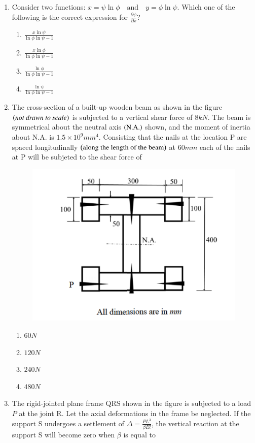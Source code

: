 \documentclass[journal,12pt,onecolumn]{IEEEtran}
\theoremstyle{remark}
\begin{document}
\begin{enumerate}
\item Consider two functions: 
$x = \psi \ln \phi \quad \text{and} \quad y = \phi \ln \psi.$
Which one of the following is the correct expression for $\frac{\partial \psi}{\partial x}$?

\hfill{}
\begin{enumerate}
\item $\displaystyle \frac{x \ln \psi}{\ln \phi \ln \psi - 1}$
\item $\displaystyle \frac{x \ln \phi}{\ln \phi \ln \psi - 1}$
\item $\displaystyle \frac{\ln \phi}{\ln \phi \ln \psi - 1}$
\item $\displaystyle \frac{\ln \psi}{\ln \phi \ln \psi - 1}$
\end{enumerate}

\item The cross-section of a built-up wooden beam as shown in the figure $\left(\textit{not drawn to scale}\right)$ is subjected to a vertical shear force of $8kN$. The beam is symmetrical about the neutral axis $\left(\text{N.A.}\right)$ shown, and the moment of inertia about N.A. is $1.5\times10^9mm^4$. Consisting that the nails at the location P are spaced longitudinally $\left(\text{along the length of the beam}\right)$ at $60mm$ each of the nails at P will be subjeted to the shear force of

\hfill{}
\begin{figure}[H]
\centering
\includegraphics[width=0.5\columnwidth]{figs/q31.png}
\caption*{}
\label{fig:Q.31}
\end{figure}
\begin{enumerate}
\item $60N$
\item $120N$
\item $240N$
\item $480N$
\end{enumerate}

\item The rigid-jointed plane frame QRS shown in the figure is subjected to a load $P$ at the joint R. Let the axial deformations in the frame be neglected. If the support S undergoes a settlement of $\Delta=\frac{PL^3}{\beta El}$, the vertical reaction at the support S will become zero when $\beta$ is equal to


\end{enumerate}
\end{document}
